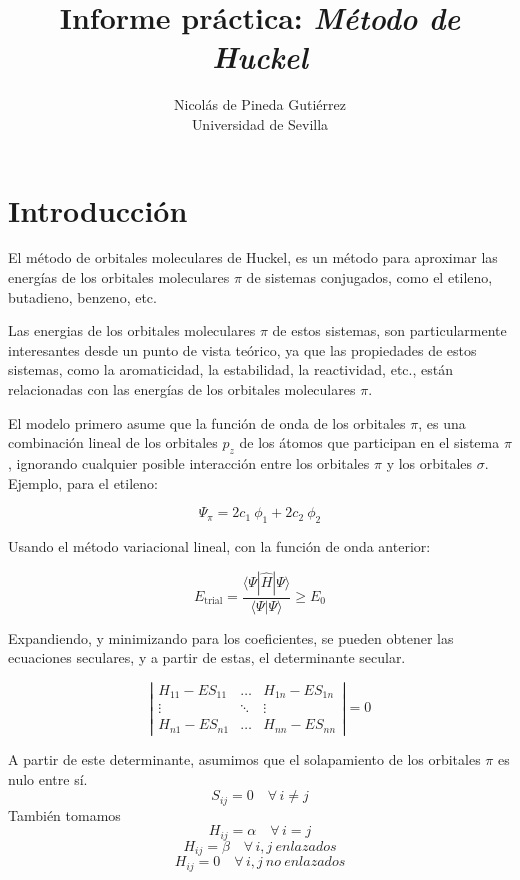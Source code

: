 \documentclass[12pt]{article}
\title{Informe práctica: \textit{Método de Huckel}}
\author{Nicolás de Pineda Gutiérrez \\[1ex] 
\small Universidad de Sevilla}
\date{}
\begin{document}
\maketitle
\thispagestyle{empty}

\renewcommand{\contentsname}{Contenido}
\newpage
\tableofcontents 

\newpage
\section{Introducción}
El método de orbitales moleculares de Huckel, es un método para aproximar las energías de los orbitales moleculares $\pi$ de sistemas conjugados, como el etileno, butadieno, benzeno, etc. \cite{lowe}

Las energias de los orbitales moleculares $\pi$ de estos sistemas, son particularmente interesantes desde un punto de vista teórico, ya que las propiedades de estos sistemas, como la aromaticidad, la estabilidad, la reactividad, etc., están relacionadas con las energías de los orbitales moleculares $\pi$.

El modelo primero asume que la función de onda de los orbitales $\pi$, es una combinación lineal de los orbitales $p_z$ de los átomos que participan en el sistema $\pi$, ignorando cualquier posible interacción entre los orbitales $\pi$ y los orbitales $\sigma$. Ejemplo, para el etileno:

\[\Psi_\pi = 2c_1\ \phi_{1} + 2c_2\ \phi_{2}\]

Usando el método variacional lineal, con la función de onda anterior: \cite{libretexts}

\[
E_{\text{trial}} = \frac{\langle \Psi | \hat{H} | \Psi \rangle}{\langle \Psi | \Psi \rangle} \geq E_{0}
\]

Expandiendo, y minimizando para los coeficientes, se pueden obtener las ecuaciones seculares, y a partir de estas, el determinante secular. \cite{yates}

\[
\left| \begin{array}{ccc} 
    H_{11}-ES_{11} & \hdots &   H_{1n}-ES_{1n} \\ 
    \vdots & \ddots &   \vdots \\
    H_{n1}-ES_{n1} & \hdots  &   H_{nn}-ES_{nn}
\end{array} \right|
=0
\]

A partir de este determinante, asumimos que el solapamiento de los orbitales $\pi$ es nulo entre sí.
\[S_{ij} = 0 \quad \forall \, i \neq j\]
También tomamos
\[H_{ij} = \alpha \quad \forall \, i = j \]
\[H_{ij} = \beta \quad \forall \, i, j\ enlazados \]
\[H_{ij} = 0 \quad \forall \, i, j\ no\ enlazados \]
\end{document}
